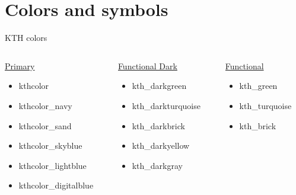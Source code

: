 \documentclass[aspectratio=169,11pt]{beamer}
\begin{document}
\section{Colors and symbols}
\begin{frame}{\insertsection}{KTH colors}
    \begin{columns}[t]
        \begin{column}{0.3\textwidth}
            \underline{Primary}
            \begin{itemize}
                \item \textcolor{kthcolor}{kthcolor}
                \item \textcolor{kthcolor_navy}{kthcolor\_navy}
                \item \textcolor{kthcolor_sand}{kthcolor\_sand}
                \item \textcolor{kthcolor_skyblue}{kthcolor\_skyblue}
                \item \textcolor{kthcolor_lightblue}{kthcolor\_lightblue}
                \item \textcolor{kthcolor_digitalblue}{kthcolor\_digitalblue}
            \end{itemize}
        \end{column}
        \begin{column}{0.28\textwidth}
            \underline{Functional Dark}
            \begin{itemize}
                \item \textcolor{kth_darkgreen}{kth\_darkgreen}
                \item \textcolor{kth_darkturquoise}{kth\_darkturquoise}
                \item \textcolor{kth_darkbrick}{kth\_darkbrick}
                \item \textcolor{kth_darkyellow}{kth\_darkyellow}
                \item \textcolor{kth_darkgray}{kth\_darkgray}
            \end{itemize}
        \end{column}
        \begin{column}{0.24\textwidth}
            \underline{Functional}
            \begin{itemize}
                \item \textcolor{kth_green}{kth\_green}
                \item \textcolor{kth_turquoise}{kth\_turquoise}
                \item \textcolor{kth_brick}{kth\_brick}

\end{itemize}
\end{column}
\end{columns}
\end{frame}
\end{document}

